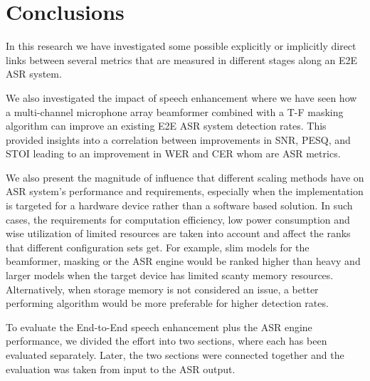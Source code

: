 \chapter{Conclusions}\label{ch:concl_ch}
\vspace{-1cm}
In this research we have 
investigated some possible 
explicitly or implicitly direct links
between
several metrics that are measured 
in different stages along an E2E ASR system.

\bigskip

We also investigated the 
impact of speech enhancement 
where we have seen how
a multi-channel microphone array beamformer
combined with a T-F masking algorithm
can improve an existing E2E ASR system detection rates.
This provided insights into a correlation 
between improvements in SNR, PESQ, and STOI
leading 
to an improvement in WER and CER whom
are ASR metrics.

\bigskip

We also present 
the magnitude of influence
that different scaling methods have 
on ASR system's performance and requirements,
especially when the implementation is targeted for
a hardware device rather than a software based solution.
In such cases, the requirements for
computation efficiency, low power consumption
and wise utilization of limited resources
are taken into account and affect the 
ranks that different configuration sets
get. For example, slim models for the
beamformer, masking or the ASR engine 
would be ranked higher than heavy and 
larger models
when the target device has limited
scanty memory resources. 
Alternatively, when storage memory is
not considered an issue, a better performing
algorithm would be more preferable
for higher detection rates.

\bigskip

To evaluate the End-to-End speech enhancement
plus the ASR engine performance, we divided
the effort into two sections, where each has been
evaluated separately. Later, the two sections 
were connected together and the evaluation was
taken from input to the ASR output.

\bigskip

